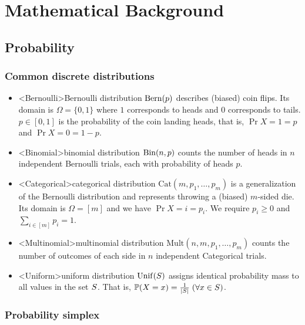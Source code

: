 \chapter{Mathematical Background}\label{sec:mathematical_background}

\section{Probability}









\subsection{Common discrete distributions}\label{sec:background:probability:common_discrete_distributions}

\begin{itemize}
  \item \midx<Bernoulli>{Bernoulli distribution} \quad $\Bern{p}$ describes (biased) coin flips.
  Its domain is ${\Omega = \{0,1\}}$ where $1$ corresponds to heads and $0$ corresponds to tails. $p \in [0,1]$ is the probability of the coin landing heads, that is, ${\Pr{X = 1} = p}$ and ${\Pr{X = 0} = 1 - p}$.
  \item \midx<Binomial>{binomial distribution} \quad $\Bin{n}{p}$ counts the number of heads in $n$ independent Bernoulli trials, each with probability of heads $p$.
  \item \midx<Categorical>{categorical distribution} \quad $\mathrm{Cat}(m, p_1, \dots, p_m)$ is a generalization of the Bernoulli distribution and represents throwing a (biased) $m$-sided die.
  Its domain is ${\Omega = [m]}$ and we have ${\Pr{X = i} = p_i}$. We require $p_i \geq 0$ and $\sum_{i \in [m]} p_i = 1$.
  \item \midx<Multinomial>{multinomial distribution} \quad $\mathrm{Mult}(n, m, p_1, \dots, p_m)$ counts the number of outcomes of each side in $n$ independent Categorical trials.
  \item \midx<Uniform>{uniform distribution} \quad $\Unif{\sS}$ assigns identical probability mass to all values in the set $S$. That is, $\Pr{X = x} = \frac{1}{|\sS|} \; (\forall x \in \sS)$.
\end{itemize}

\subsection{Probability simplex}\label{sec:background:probability:probability_simplex}

